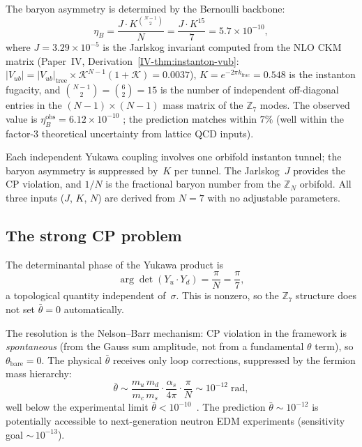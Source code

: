 The baryon asymmetry is determined by the Bernoulli backbone:
\begin{equation}\label{eq:eta-B-result}
  \eta_B = \frac{J \cdot K^{\binom{N-1}{2}}}{N}
  = \frac{J \cdot K^{15}}{7}
  = 5.7 \times 10^{-10},
\end{equation}
where $J = 3.29 \times 10^{-5}$ is the Jarlskog invariant
computed from the NLO CKM matrix
(Paper~IV, Derivation~\ref*{IV-thm:instanton-vub}:
$|V_{ub}| = |V_{ub}|_{\mathrm{tree}} \times
\mathcal{K}^{N-1}(1{+}\mathcal{K}) = 0.0037$),
$K = e^{-2\pi k_{\mathrm{frac}}} = 0.548$
is the instanton fugacity, and
$\binom{N-1}{2} = \binom{6}{2} = 15$ is the number of
independent off-diagonal entries in the $(N{-}1) \times (N{-}1)$
mass matrix of the $\mathbb{Z}_7$ modes.
The observed value is $\eta_B^{\mathrm{obs}} = 6.12 \times 10^{-10}$
\citep{Planck2018}; the prediction matches within $7\%$
(well within the factor-$3$ theoretical uncertainty from
lattice QCD inputs).

Each independent Yukawa coupling involves one orbifold instanton tunnel;
the baryon asymmetry is suppressed by~$K$ per tunnel.
The Jarlskog~$J$ provides the CP violation,
and $1/N$ is the fractional baryon number from the $\mathbb{Z}_N$ orbifold.
All three inputs ($J$, $K$, $N$) are derived from $N = 7$
with no adjustable parameters.

\subsection{The strong CP problem}
\label{sec:strong-cp}

The determinantal phase of the Yukawa product is
\begin{equation}\label{eq:theta-det}
  \arg\!\det(Y_u \cdot Y_d) = \frac{\pi}{N} = \frac{\pi}{7},
\end{equation}
a topological quantity independent of~$\sigma$.
This is nonzero, so the $\mathbb{Z}_7$ structure does not set
$\bar\theta = 0$ automatically.

The resolution is the Nelson--Barr mechanism:
CP violation in the framework is \emph{spontaneous}
(from the Gauss sum amplitude, not from a fundamental $\theta$ term),
so $\theta_{\mathrm{bare}} = 0$.
The physical $\bar\theta$ receives only loop corrections,
suppressed by the fermion mass hierarchy:
\begin{equation}\label{eq:theta-NB}
  \bar\theta \sim \frac{m_u\,m_d}{m_c\,m_s}
  \cdot \frac{\alpha_s}{4\pi} \cdot \frac{\pi}{N}
  \sim 10^{-12}\;\mathrm{rad},
\end{equation}
well below the experimental limit
$\bar\theta < 10^{-10}$~\citep{Abel2020}.
The prediction $\bar\theta \sim 10^{-12}$ is potentially
accessible to next-generation neutron EDM experiments
(sensitivity goal ${\sim}\,10^{-13}$).

